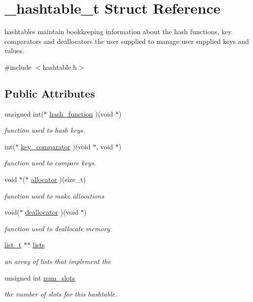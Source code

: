 \hypertarget{struct__hashtable__t}{}\section{\+\_\+hashtable\+\_\+t Struct Reference}
\label{struct__hashtable__t}


hashtables maintain bookkeeping information about the hash functions, key comparators and deallocators the user supplied to manage user supplied keys and values.  




{\ttfamily \#include $<$hashtable.\+h$>$}

\subsection*{Public Attributes}
\begin{DoxyCompactItemize}
\item 
unsigned int($\ast$ \hyperlink{struct__hashtable__t_aa837007e529fa6837bca0cab2d31340a}{hash\+\_\+function} )(void $\ast$)
\begin{DoxyCompactList}\small\item\em function used to hash keys. \end{DoxyCompactList}\item 
int($\ast$ \hyperlink{struct__hashtable__t_abb515b666a0adc3ebed1f815af2ac367}{key\+\_\+comparator} )(void $\ast$, void $\ast$)
\begin{DoxyCompactList}\small\item\em function used to compare keys. \end{DoxyCompactList}\item 
void $\ast$($\ast$ \hyperlink{struct__hashtable__t_ac6760550899baf2bf96ab0c72bb49029}{allocator} )(size\+\_\+t)
\begin{DoxyCompactList}\small\item\em function used to make allocations \end{DoxyCompactList}\item 
void($\ast$ \hyperlink{struct__hashtable__t_ab4b20ea8ea22a5c4ba1b8302cc1dfbf1}{deallocator} )(void $\ast$)
\begin{DoxyCompactList}\small\item\em function used to deallocate memory \end{DoxyCompactList}\item 
\hyperlink{list_8h_a0827dd560c5b281863fea20f22abeff6}{list\+\_\+t} $\ast$$\ast$ \hyperlink{struct__hashtable__t_a56b35ee01c14fd9e50595decd7077614}{lists}
\begin{DoxyCompactList}\small\item\em an array of lists that implement the \end{DoxyCompactList}\item 
unsigned int \hyperlink{struct__hashtable__t_a84bd70632a7cb9d77aaa0f9d4ce10adc}{num\+\_\+slots}
\begin{DoxyCompactList}\small\item\em the number of slots for this hashtable. \end{DoxyCompactList}\end{DoxyCompactItemize}


